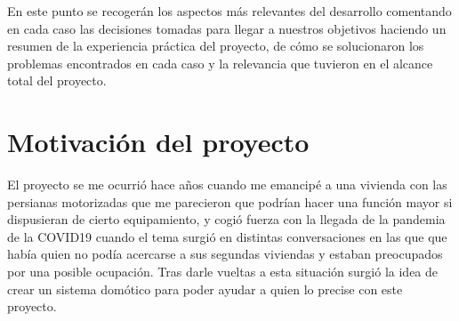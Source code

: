 En este punto se recogerán los aspectos más relevantes del desarrollo comentando en cada caso las decisiones tomadas para llegar a nuestros objetivos haciendo un resumen de la experiencia práctica del proyecto, de cómo se solucionaron los problemas encontrados en cada caso y la relevancia que tuvieron en el alcance total del proyecto.

\section{Motivación del proyecto}
El proyecto se me ocurrió hace años cuando me emancipé a una vivienda con las persianas motorizadas que me parecieron que podrían hacer una función mayor si dispusieran de cierto equipamiento, y cogió fuerza con la llegada de la pandemia de la COVID19 cuando el tema surgió en distintas conversaciones en las que que había quien no podía acercarse a sus segundas viviendas y estaban preocupados por una posible ocupación. Tras darle vueltas a esta situación surgió la idea de crear un sistema domótico para poder ayudar a quien lo precise con este proyecto.

